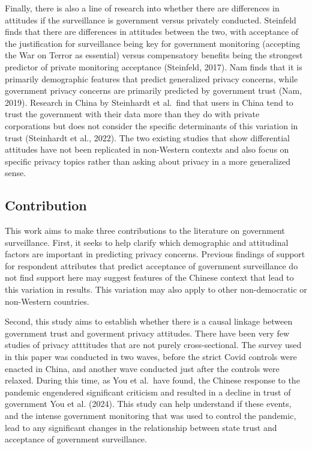 \documentclass[
  letterpaper,
  DIV=11,
  numbers=noendperiod]{scrartcl}
\begin{document}
Finally, there is also a line of research into whether there are
differences in attitudes if the surveillance is government versus
privately conducted. Steinfeld finds that there are differences in
attitudes between the two, with acceptance of the justification for
surveillance being key for government monitoring (accepting the War on
Terror as essential) versus compensatory benefits being the strongest
predictor of private monitoring acceptance (Steinfeld, 2017). Nam finds
that it is primarily demographic features that predict generalized
privacy concerns, while government privacy concerns are primarily
predicted by government trust (Nam, 2019). Research in China by
Steinhardt et al.~find that users in China tend to trust the government
with their data more than they do with private corporations but does not
consider the specific determinants of this variation in trust
(Steinhardt et al., 2022). The two existing studies that show
differential attitudes have not been replicated in non-Western contexts
and also focus on specific privacy topics rather than asking about
privacy in a more generalized sense.

\subsection{Contribution}\label{contribution}

This work aims to make three contributions to the literature on
government surveillance. First, it seeks to help clarify which
demographic and attitudinal factors are important in predicting privacy
concerns. Previous findings of support for respondent attributes that
predict acceptance of government surveillance do not find support here
may suggest features of the Chinese context that lead to this variation
in results. This variation may also apply to other non-democratic or
non-Western countries.

Second, this study aims to establish whether there is a causal linkage
between government trust and goverment privacy attitudes. There have
been very few studies of privacy atttitudes that are not purely
cross-sectional. The survey used in this paper was conducted in two
waves, before the strict Covid controls were enacted in China, and
another wave conducted just after the controls were relaxed. During this
time, as You et al.~have found, the Chinese response to the pandemic
engendered significant criticism and resulted in a decline in trust of
government You et al. (2024). This study can help understand if these
events, and the intense government monitoring that was used to control
the pandemic, lead to any significant changes in the relationship
between state trust and acceptance of government surveillance.
\end{document}
